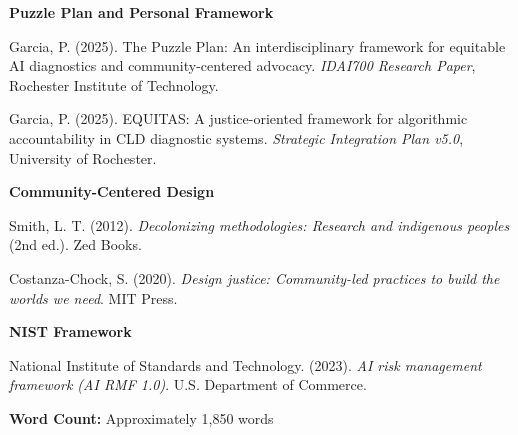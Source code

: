 \documentclass[12pt,letterpaper]{article}
\begin{document}
\textbf{Puzzle Plan and Personal Framework}

Garcia, P. (2025). The Puzzle Plan: An interdisciplinary framework for equitable AI diagnostics and community-centered advocacy. \textit{IDAI700 Research Paper}, Rochester Institute of Technology.

Garcia, P. (2025). EQUITAS: A justice-oriented framework for algorithmic accountability in CLD diagnostic systems. \textit{Strategic Integration Plan v5.0}, University of Rochester.

\textbf{Community-Centered Design}

Smith, L. T. (2012). \textit{Decolonizing methodologies: Research and indigenous peoples} (2nd ed.). Zed Books.

Costanza-Chock, S. (2020). \textit{Design justice: Community-led practices to build the worlds we need}. MIT Press.

\textbf{NIST Framework}

National Institute of Standards and Technology. (2023). \textit{AI risk management framework (AI RMF 1.0)}. U.S. Department of Commerce.

\vspace{1cm}

\noindent\textbf{Word Count:} Approximately 1,850 words
\end{document}
